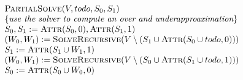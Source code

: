 \documentclass{article}
\begin{document}
\begin{equation*}
\begin{array}{l}
\textsc{PartialSolve}(V,todo,S_0,S_1)\\
\{\textit{use the solver to compute an over and underapproaximation}\}\\
S_0,S_1 := \textsc{Attr}(S_0, 0), \textsc{Attr}(S_1,1) \\
(W_0,W_1) := \textsc{SolveRecursive}(V \setminus (S_1 \cup \textsc{Attr}(S_0 \cup todo,0)))\\
S_1 := \textsc{Attr}(S_1 \cup W_1,1) \\
(W_0,W_1) := \textsc{SolveRecursive}(V \setminus (S_0 \cup \textsc{Attr}(S_1 \cup todo,1)))\\
S_0 := \textsc{Attr}(S_0 \cup W_0,0) \\
\end{array}
\end{equation*}
\end{document}
